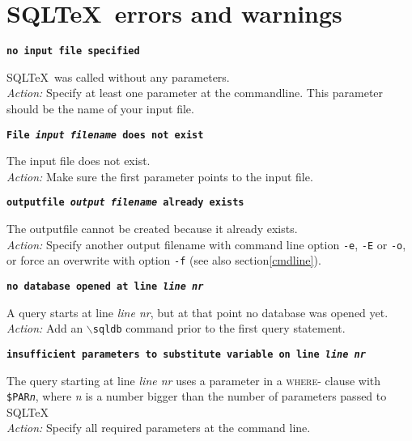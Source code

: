 \documentclass{article}
\newcommand{\bs}{\ensuremath{\backslash}}
\newcommand{\vs}{\vspace{3mm}}
\begin{document}
\section{SQL\TeX\ errors and warnings}

\noindent\textbf{\texttt{no input file specified}}

\vspace{1mm}

\noindent SQL\TeX\ was called without any parameters.\\
\textit{Action:} Specify at least one parameter at the commandline. This parameter should be
the name of your input file.

\vs

\noindent\textbf{\texttt{File \textit{input filename} does not exist}}

\vspace{1mm}

\noindent The input file does not exist.\\
\textit{Action:} Make sure the first parameter points to the input file.

\vs

\noindent\textbf{\texttt{outputfile \textit{output filename} already exists}}

\vspace{1mm}

\noindent The outputfile cannot be created because it already exists.\\
\textit{Action:} Specify another output filename with command line option \texttt{-e},
\texttt{-E} or \texttt{-o}, or force an overwrite with option \texttt{-f} (see also section\ref{cmdline}).

\vs

\noindent\textbf{\texttt{no database opened at line \textit{line nr}}}

\vspace{1mm}

\noindent A query starts at line \textit{line nr}, but at that point no database was opened yet. \\
\textit{Action:} Add an \texttt{\bs sqldb} command prior to the first query statement.

\vs

\noindent\textbf{\texttt{insufficient parameters to substitute variable on line \textit{line nr}}}

\vspace{1mm}

\noindent The query starting at line \textit{line nr} uses a parameter in a \textsc{where}- clause with
\texttt{\$PAR\textit{n}}, where \textit{n} is a number bigger than the number of parameters
passed to SQL\TeX\. \\
\textit{Action:} Specify all required parameters at the command line.
\end{document}
